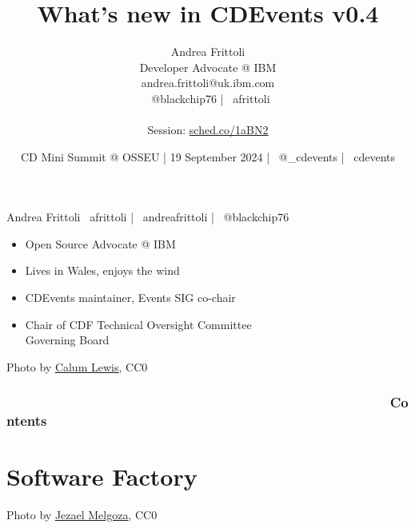 \documentclass[aspectratio=169,11pt,hyperref={colorlinks=true}]{beamer}
\title{What’s new in CDEvents v0.4}
\date[19 September 2024]{CD Mini Summit @ OSSEU | 19 September 2024 | \faTwitter ~@\_cdevents | \faGithub ~cdevents}
\author[Andrea Frittoli]{%
  Andrea Frittoli \\
  Developer Advocate @ IBM\\
  andrea.frittoli@uk.ibm.com \\
  \faTwitter ~@blackchip76 | \faGithub ~afrittoli\\
  ~\\
  Session: \href{https://sched.co/1aBN2}{sched.co/1aBN2}
}
\begin{document}
\begin{frame}
\titlepage{}
\end{frame}

\begin{speakerframe}{Andrea Frittoli}%
  {%
  \faGithub ~afrittoli | \faLinkedin ~andreafrittoli | \faTwitter ~@blackchip76
  }%
  {%
  \begin{itemize}
    \item{Open Source Advocate @ IBM}
    \item{Lives in Wales, enjoys the wind}
    \item{CDEvents maintainer, Events SIG co-chair}
    \item{Chair of CDF Technical Oversight Committee \\ Governing Board}
  \end{itemize}
  }%
\end{speakerframe}

\begin{lpicrblack}{%
  Photo by \href{https://unsplash.com/@calumlewis}{\underline{Calum Lewis}}, CC0
  }%
  {%
  \tableofcontents
  }%
  {}
  \frametitle{~~~~~~~~~~~~~~~~~~~~~~~~~~~~~~~~~~~~~~~~~~~~~~~~~~~Contents}
\end{lpicrblack}

\section[Software Factory]{Software Factory}

\begin{sectionwithpiclargecentral}{Photo by \href{https://unsplash.com/@jezar}{\underline{Jezael Melgoza}}, CC0}
\end{sectionwithpiclargecentral}
\end{document}
